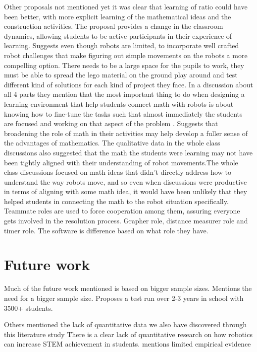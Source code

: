 \bigskip\noindent
Other proposals not mentioned yet
\cite{norton2004using}it was clear that learning of ratio could have been better, with more explicit learning of the mathematical ideas and the construction activities. 
\cite{mitnik2009collaborative} The proposal provides a change in the classroom dynamics, allowing students to be active participants in their experience of learning. 
\cite{silk2011resources} Suggests even though robots are limited, to incorporate well crafted robot challenges that make figuring out simple movements on the robots a more compelling option. 
\cite{lindh2007does} There needs to be a large space for the pupils to work, they must be able to spread the lego material on the ground play around and test different kind of solutions for each kind of project they face.
\cite{silk2011resources} In a discussion about all 4 parts they mention that the most important thing to do when designing a learning environment that help students connect math with robots is about knowing how to fine-tune the tasks such that almost immediately the students are focused and working on that aspect of the problem . 
\cite{silk2011resources} Suggests that broadening the role of math in their activities may help develop a fuller sense of the advantages of mathematics. The qualitative data in the whole class discussions also suggested that the math the students were learning may not have been tightly aligned with their understanding of robot movements.The whole class discussions focused on math ideas that didn't directly address how to understand the way robots move, and so even when discussions were productive in terms of aligning with some math idea, it would have been unlikely that they helped students in connecting the math to the robot situation specifically. 
\cite{mitnik2009collaborative} Teammate roles are used to force cooperation among them, assuring everyone gets involved in the resolution process. Grapher role, distance measurer role and timer role. The software is difference based on what role they have. 

\section{Future work}
Much of the future work mentioned is based on bigger sample sizes. 
\cite{mitnik2009collaborative} Mentions the need for a bigger sample size.
\cite{lindh2007does} Proposes a test run over 2-3 years in school with 3500+ students. 

\bigskip\noindent
Others mentioned the lack of quantitative data we also have discovered through this literature study
\cite{barker2007robotics} There is a clear lack of quantitative research on how robotics can increase STEM achievement in students. 
\cite{williams2007acquisition} mentions limited empirical evidence

